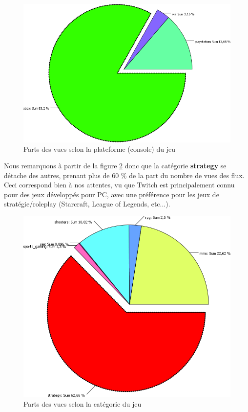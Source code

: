 \documentclass[11pt, a4paper, titlepage]{scrartcl}
\begin{document}
\begin{figure}[h]
    \centering
    \includegraphics[scale=0.4]{images/main_consoles}
    \caption{Parts des vues selon la plateforme (console) du jeu}
    \label{fig:main_consoles}
\end{figure}

Nous remarquons à partir de la figure \ref{fig:main_categories} donc que la
catégorie \textbf{strategy} se détache des autres, prenant plus de 60 \% de la
part du nombre de vues des flux. Ceci correspond bien à nos attentes, vu que
Twitch est principalement connu pour des jeux développés pour PC, avec une
préférence pour les jeux de stratégie/roleplay (Starcraft, League of Legends,
etc...).

\begin{figure}[h]
    \centering
    \includegraphics[scale=0.4]{images/main_categories}
    \caption{Parts des vues selon la catégorie du jeu}
    \label{fig:main_categories}
\end{figure}
\end{document}
